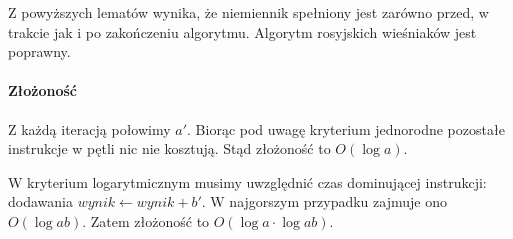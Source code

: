 Z powyższych lematów wynika, że niemiennik spełniony jest zarówno przed, w trakcie jak i po zakończeniu algorytmu. 
Algorytm rosyjskich wieśniaków jest poprawny.

\paragraph{Złożoność}

Z każdą iteracją połowimy $a'$. 
Biorąc pod uwagę kryterium jednorodne pozostałe instrukcje w pętli nic nie kosztują. 
Stąd złożoność to $O(\log a)$.

W kryterium logarytmicznym musimy uwzględnić czas dominującej instrukcji: dodawania  $wynik \leftarrow wynik + b'$. 
W najgorszym przypadku zajmuje ono $O(\log ab)$. Zatem złożoność to $O(\log a \cdot \log ab)$.
